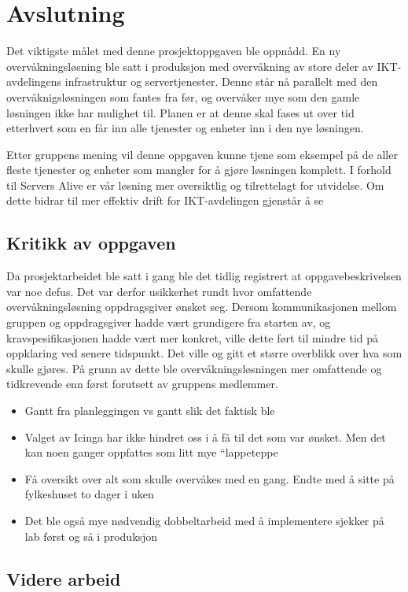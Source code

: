 \section{Avslutning}
Det viktigste målet med denne prosjektoppgaven ble oppnådd. En ny overvåkningsløsning ble satt i produksjon med overvåkning av store deler av IKT-avdelingens infrastruktur og servertjenester. Denne står nå parallelt med den overvåknigsløsningen som fantes fra før, og overvåker mye som den gamle løsningen ikke har mulighet til. Planen er at denne skal fases ut over tid etterhvert som en får inn alle tjenester og enheter inn i den nye løsningen. 

Etter gruppens mening vil denne oppgaven kunne tjene som eksempel på de aller fleste tjenester og enheter som mangler for å gjøre løsningen komplett. I forhold til Servers Alive er vår løsning mer oversiktlig og tilrettelagt for utvidelse. Om dette bidrar til mer effektiv drift for IKT-avdelingen gjenstår å se

\subsection{Kritikk av oppgaven}
Da prosjektarbeidet ble satt i gang ble det tidlig registrert at oppgavebeskrivelsen var noe defus. Det var derfor usikkerhet rundt hvor omfattende overvåkningsløsning oppdragsgiver ønsket seg. Dersom kommunikasjonen mellom gruppen og oppdragsgiver hadde vært grundigere fra starten av, og kravspesifikasjonen hadde vært mer konkret, ville dette ført til mindre tid på oppklaring ved senere tidspunkt. Det ville og gitt et større overblikk over hva som skulle gjøres. På grunn av dette ble overvåkningsløsningen mer omfattende og tidkrevende enn først forutsett av gruppens medlemmer.

\begin{itemize}
	\item Gantt fra planleggingen vs gantt slik det faktisk ble
	\item Valget av Icinga har ikke hindret oss i å få til det som var ønsket. Men det kan noen ganger oppfattes som litt mye “lappeteppe
	\item Få oversikt over alt som skulle overvåkes med en gang. Endte med å sitte på fylkeshuset to dager i uken
	\item Det ble også mye nødvendig dobbeltarbeid med å implementere sjekker på lab først og så i produksjon
\end{itemize}

\subsection{Videre arbeid}

